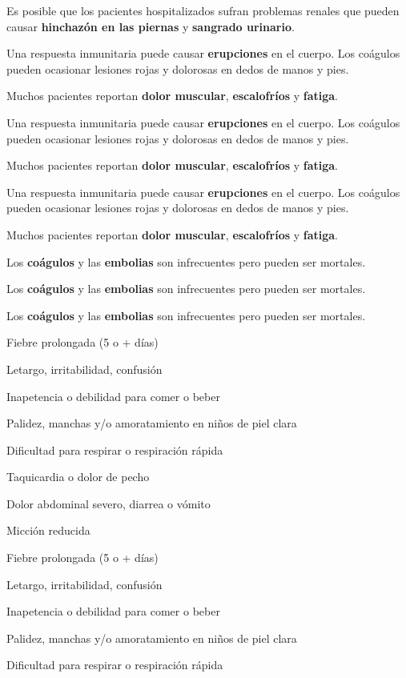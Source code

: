 Es posible que los pacientes hospitalizados sufran problemas renales que
pueden causar \textbf{hinchazón en las piernas} y \textbf{sangrado
urinario}.

Una respuesta inmunitaria puede causar \textbf{erupciones} en el cuerpo.
Los coágulos pueden ocasionar lesiones rojas y dolorosas en dedos de
manos y pies.

Muchos pacientes reportan \textbf{dolor muscular}, \textbf{escalofríos}
y \textbf{fatiga}.

Una respuesta inmunitaria puede causar \textbf{erupciones} en el cuerpo.
Los coágulos pueden ocasionar lesiones rojas y dolorosas en dedos de
manos y pies.

Muchos pacientes reportan \textbf{dolor muscular}, \textbf{escalofríos}
y \textbf{fatiga}.

Una respuesta inmunitaria puede causar \textbf{erupciones} en el cuerpo.
Los coágulos pueden ocasionar lesiones rojas y dolorosas en dedos de
manos y pies.

Muchos pacientes reportan \textbf{dolor muscular}, \textbf{escalofríos}
y \textbf{fatiga}.

Los \textbf{coágulos} y las \textbf{embolias} son infrecuentes pero
pueden ser mortales.

Los \textbf{coágulos} y las \textbf{embolias} son infrecuentes pero
pueden ser mortales.

Los \textbf{coágulos} y las \textbf{embolias} son infrecuentes pero
pueden ser mortales.

Fiebre prolongada (5 o + días)

Letargo, irritabilidad, confusión

Inapetencia o debilidad para comer o beber

Palidez, manchas y/o amoratamiento en niños de piel clara

Dificultad para respirar o respiración rápida

Taquicardia o dolor de pecho

Dolor abdominal severo, diarrea o vómito

Micción reducida

Fiebre prolongada (5 o + días)

Letargo, irritabilidad, confusión

Inapetencia o debilidad para comer o beber

Palidez, manchas y/o amoratamiento en niños de piel clara

Dificultad para respirar o respiración rápida

